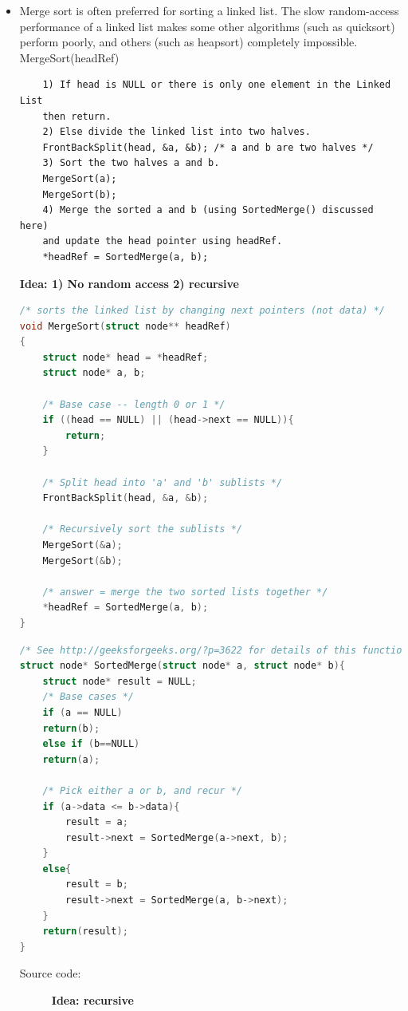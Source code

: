 \documentclass[a4paper,11pt,twoside]{book}
\begin{document}
\begin{itemize}
	

	\item Merge sort is often preferred for sorting a linked list. The slow random-access performance of a linked list makes some other algorithms (such as quicksort) perform poorly, and others (such as heapsort) completely impossible. MergeSort(headRef)
\begin{verbatim}
	1) If head is NULL or there is only one element in the Linked List 
	then return.
	2) Else divide the linked list into two halves.  
	FrontBackSplit(head, &a, &b); /* a and b are two halves */
	3) Sort the two halves a and b.
	MergeSort(a);
	MergeSort(b);
	4) Merge the sorted a and b (using SortedMerge() discussed here) 
	and update the head pointer using headRef.
	*headRef = SortedMerge(a, b);
\end{verbatim}
\textbf{Idea: 1) No random access 2) recursive}

\begin{lstlisting}[frame=single, language=c++] 
/* sorts the linked list by changing next pointers (not data) */
void MergeSort(struct node** headRef)
{
	struct node* head = *headRef;
	struct node* a, b;
	
	/* Base case -- length 0 or 1 */
	if ((head == NULL) || (head->next == NULL)){
		return;
	}
	
	/* Split head into 'a' and 'b' sublists */
	FrontBackSplit(head, &a, &b); 
	
	/* Recursively sort the sublists */
	MergeSort(&a);
	MergeSort(&b);
	
	/* answer = merge the two sorted lists together */
	*headRef = SortedMerge(a, b);
}		
\end{lstlisting}

\begin{lstlisting}[frame=single, language=c++] 
/* See http://geeksforgeeks.org/?p=3622 for details of this function */
struct node* SortedMerge(struct node* a, struct node* b){
	struct node* result = NULL;	
	/* Base cases */
	if (a == NULL)
	return(b);
	else if (b==NULL)
	return(a);
	
	/* Pick either a or b, and recur */
	if (a->data <= b->data){
		result = a;
		result->next = SortedMerge(a->next, b);
	}
	else{
		result = b;
		result->next = SortedMerge(a, b->next);
	}
	return(result);
}	
\end{lstlisting}
\begin{description}
	\item[Source code:] \textbf{Idea: recursive}
\end{description}


\end{itemize}
\end{document}
